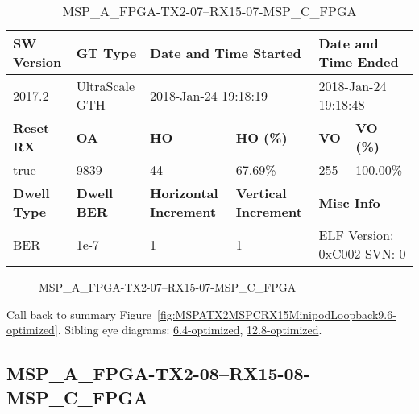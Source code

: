 \begin{table}[h]
\centering
\caption{MSP\_A\_FPGA-TX2-07--RX15-07-MSP\_C\_FPGA}
\label{tab:MSPAFPGATX207RX1507MSPCFPGA9.6-optimized}
\begin{tabular}{@{}|l|l|l|l|l|l|@{}}
\toprule
\textbf{SW Version}                & \textbf{GT Type}   & \multicolumn{2}{l|}{\textbf{Date and Time Started}}            & \multicolumn{2}{l|}{\textbf{Date and Time Ended}}        \\ \midrule
2017.2                       & UltraScale GTH          & \multicolumn{2}{l|}{2018-Jan-24 19:18:19}                   & \multicolumn{2}{l|}{2018-Jan-24 19:18:48}               \\ \midrule
\textbf{Reset RX}                  & \textbf{OA} & \textbf{HO}   & \textbf{HO (\%)} & \textbf{VO} & \textbf{VO (\%)} \\ \midrule
true & 9839        & 44          & 67.69\%        & 255        & 100.00\%       \\ \midrule
\textbf{Dwell Type}                & \textbf{Dwell BER} & \textbf{Horizontal Increment} & \textbf{Vertical Increment}    & \multicolumn{2}{l|}{\textbf{Misc Info}}                  \\ \midrule
BER                            & 1e-7        & 1        & 1           & \multicolumn{2}{l|}{ELF Version: 0xC002 SVN: 0}                         \\ \bottomrule
\end{tabular}
\end{table}

\begin{figure}[h]
\caption{MSP\_A\_FPGA-TX2-07--RX15-07-MSP\_C\_FPGA} \label{fig:MSPAFPGATX207RX1507MSPCFPGA9.6-optimized}
\end{figure}

Call back to summary Figure~\ref{fig:MSPATX2MSPCRX15MinipodLoopback9.6-optimized}.
Sibling eye diagrams: \hyperref[sec:MSPAFPGATX207RX1507MSPCFPGA6.4-optimized]{6.4-optimized}, \hyperref[sec:MSPAFPGATX207RX1507MSPCFPGA12.8-optimized]{12.8-optimized}.

\clearpage
\newpage


\subsection{MSP\_A\_FPGA-TX2-08--RX15-08-MSP\_C\_FPGA}\label{sec:MSPAFPGATX208RX1508MSPCFPGA9.6-optimized}

